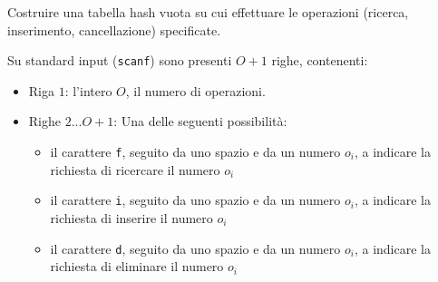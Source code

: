 \usepackage{xcolor}
\usepackage{afterpage}
\usepackage{pifont,mdframed}
\usepackage[bottom]{footmisc}


\renewcommand{\inputfile}{\texttt{stdin}}
\renewcommand{\outputfile}{\texttt{stdout}}
\makeatletter
\renewcommand{\this@inputfilename}{\texttt{stdin}}
\renewcommand{\this@outputfilename}{\texttt{stdout}}
\makeatother


\newenvironment{warning}
  {\par\begin{mdframed}[linewidth=2pt,linecolor=gray]%
    \begin{list}{}{\leftmargin=1cm
                   \labelwidth=\leftmargin}\item[\Large\ding{43}]}
  {\end{list}\end{mdframed}\par}


Costruire una tabella hash vuota su cui effettuare le operazioni (ricerca,
inserimento, cancellazione) specificate.



\InputFile
Su standard input (\texttt{scanf}) sono presenti $O+1$ righe, contenenti:
\begin{itemize}[nolistsep,itemsep=2mm]
\item Riga $1$: l'intero $O$, il numero di operazioni.
\item Righe $2...O+1$: Una delle seguenti possibilità:
    \begin{itemize}
        \item il carattere \texttt{f}, seguito da uno spazio e da
        un numero $o_i$, a indicare la richiesta di ricercare il numero $o_i$
        \item il carattere \texttt{i}, seguito da uno spazio e da
        un numero $o_i$, a indicare la richiesta di inserire il numero $o_i$
        \item il carattere \texttt{d}, seguito da uno spazio e da
        un numero $o_i$, a indicare la richiesta di eliminare il numero $o_i$
    \end{itemize}
\end{itemize}

